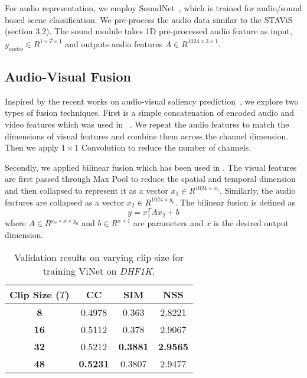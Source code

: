 \documentclass[letterpaper, 10 pt, conference]{ieeeconf}  \usepackage{times}
\begin{document}
For audio representation, we employ SoundNet~\cite{aytar2016soundnet}, which is trained for audio/sound based scene classification. We pre-process the audio data similar to the STAViS~\cite{tsiami2020stavis} (section 3.2). The sound module takes 1D pre-processed audio feature as input, $y_{audio}\in R^{1\times\hat{T}\times1}$ and outputs audio features $A\in R^{1024\times3\times1}$.  



\subsection{Audio-Visual Fusion}
Inspired by the recent works on audio-visual saliency prediction~\cite{tsiami2020stavis,tavakoli2019dave}, we explore two types of fusion techniques. First is a simple concatenation of encoded audio and video features which was used in ~\cite{tavakoli2019dave}. We repeat the audio features to match the dimensions of visual features and combine them across the channel dimension. Then we apply $1\times1$ Convolution to reduce the number of channels.

Secondly, we applied bilinear fusion which has been used in \cite{tsiami2020stavis}. The visual features are first passed through Max Pool to reduce the spatial and temporal dimension and then collapsed to represent it as a vector $x_{1}\in R^{1024\times x_{0}}$. Similarly, the audio features are collapsed as a vector $x_{2}\in R^{1024\times y_{0}}$. The bilinear fusion is defined as 
\begin{equation}
    y = x_{1}^TAx_{2} + b
\end{equation}
where $A\in R^{x_{0}\times x \times y_{0}}$ and $b\in R^{x\times 1}$ are parameters and $x$ is the desired output dimension. 




\begin{table}[]
    \caption{Validation results on varying clip size for training ViNet on \emph{DHF1K}.}
    \begin{center}
    
\begin{tabular}{|c|ccc|}
\hline
       \textbf{Clip Size ($T$)} & CC  & SIM & NSS \\
\hline\hline
    \textbf{8}           &0.4978	&0.363	&2.8221 \\
    \textbf{16}           &0.5112	&0.378	&2.9067 \\
    \textbf{32}          &0.5212	&\textbf{0.3881}	&\textbf{2.9565} \\
    \textbf{48}          &\textbf{0.5231}	&0.3807	&2.9477 \\
\hline
    \end{tabular}
    \end{center}
    
    \label{tab:clip_length}
\end{table}
\end{document}
